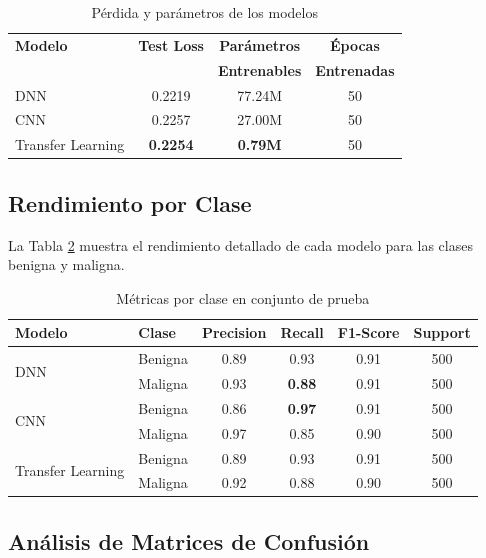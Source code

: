 \documentclass[11pt, a4paper]{article}
\begin{document}
\begin{table}[H]
\centering
\caption{Pérdida y parámetros de los modelos}
\label{tab:loss_params}
\begin{tabular}{@{}lccc@{}}
\toprule
\textbf{Modelo} & \textbf{Test Loss} & \textbf{Parámetros} & \textbf{Épocas} \\
 & & \textbf{Entrenables} & \textbf{Entrenadas} \\
\midrule
DNN               & 0.2219 & 77.24M  & 50 \\
CNN               & 0.2257 & 27.00M  & 50 \\
Transfer Learning & \textbf{0.2254} & \textbf{0.79M}   & 50 \\
\bottomrule
\end{tabular}
\end{table}

\subsection{Rendimiento por Clase}

La Tabla \ref{tab:resultados_por_clase} muestra el rendimiento detallado de cada modelo para las clases benigna y maligna.

\begin{table}[H]
\centering
\caption{Métricas por clase en conjunto de prueba}
\label{tab:resultados_por_clase}
\begin{tabular}{@{}llcccc@{}}
\toprule
\textbf{Modelo} & \textbf{Clase} & \textbf{Precision} & \textbf{Recall} & \textbf{F1-Score} & \textbf{Support} \\
\midrule
\multirow{2}{*}{DNN} & Benigna  & 0.89 & 0.93 & 0.91 & 500 \\
                     & Maligna  & 0.93 & \textbf{0.88} & 0.91 & 500 \\
\midrule
\multirow{2}{*}{CNN} & Benigna  & 0.86 & \textbf{0.97} & 0.91 & 500 \\
                     & Maligna  & 0.97 & 0.85 & 0.90 & 500 \\
\midrule
\multirow{2}{*}{Transfer Learning} & Benigna  & 0.89 & 0.93 & 0.91 & 500 \\
                                   & Maligna  & 0.92 & 0.88 & 0.90 & 500 \\
\bottomrule
\end{tabular}
\end{table}

\subsection{Análisis de Matrices de Confusión}
\end{document}
